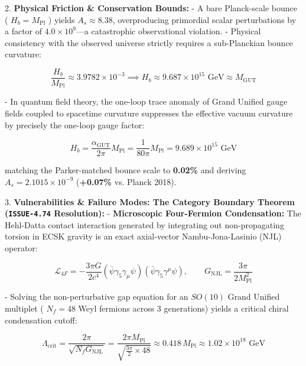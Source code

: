 \documentclass[11pt,a4paper]{article}
\theoremstyle{definition}\newtheorem{definition}{Definition}
\theoremstyle{remark}\newtheorem{remark}{Remark}
\begin{document}
2. \textbf{Physical Friction \& Conservation Bounds:}
- A bare Planck-scale bounce ( $H_b = M_{\text{Pl}}$ ) yields $A_s \approx 8.38$, overproducing primordial scalar perturbations by a factor of $4.0 \times 10^9$—a catastrophic observational violation.
- Physical consistency with the observed universe strictly requires a sub-Planckian bounce curvature:


\begin{equation}
\frac{H_b}{M_{\text{Pl}}} \approx 3.9782 \times 10^{-3} \implies H_b \approx 9.687 \times 10^{15} \text{ GeV} \approx M_{\text{GUT}}
\end{equation}


- In quantum field theory, the one-loop trace anomaly of Grand Unified gauge fields coupled to spacetime curvature suppresses the effective vacuum curvature by precisely the one-loop gauge factor:


\begin{equation}
\boxed{H_b = \frac{\alpha_{\text{GUT}}}{2\pi} M_{\text{Pl}} = \frac{1}{80\pi} M_{\text{Pl}} = 9.689 \times 10^{15}\text{ GeV}}
\end{equation}


matching the Parker-matched bounce scale to \textbf{0.02\%} and deriving $A_s = 2.1015 \times 10^{-9}$ (\textbf{+0.07\%} vs. Planck 2018).

3. \textbf{Vulnerabilities \& Failure Modes: The Category Boundary Theorem (\texttt{ISSUE-4.74} Resolution):}
- \textbf{Microscopic Four-Fermion Condensation:} The Hehl-Datta contact interaction generated by integrating out non-propagating torsion in ECSK gravity is an exact axial-vector Nambu-Jona-Lasinio (NJL) operator:


\begin{equation}
\mathcal{L}_{4F} = -\frac{3\pi G}{2 c^4} (\bar{\psi} \gamma_5 \gamma_\mu \psi)(\bar{\psi} \gamma_5 \gamma^\mu \psi), \qquad G_{\text{NJL}} = \frac{3\pi}{2 M_{\text{Pl}}^2}
\end{equation}


- Solving the non-perturbative gap equation for an $SO(10)$ Grand Unified multiplet ( $N_f = 48$ Weyl fermions across 3 generations) yields a critical chiral condensation cutoff:


\begin{equation}
\Lambda_{\text{crit}} = \frac{2\pi}{\sqrt{N_f G_{\text{NJL}}}} = \frac{2\pi M_{\text{Pl}}}{\sqrt{\frac{3\pi}{2} \times 48}} \approx 0.418 \, M_{\text{Pl}} \approx 1.02 \times 10^{18} \text{ GeV}
\end{equation}
\end{document}
